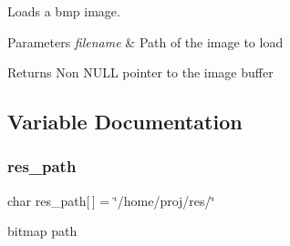 Loads a bmp image. 


\begin{DoxyParams}{Parameters}
{\em filename} & Path of the image to load \\
\hline
\end{DoxyParams}
\begin{DoxyReturn}{Returns}
Non N\+U\+LL pointer to the image buffer 
\end{DoxyReturn}


\subsection{Variable Documentation}
\mbox{\label{group___bitmap_ga2b225ffd0d59618d1b1fa8396ab6e970}} 
\subsubsection{\texorpdfstring{res\+\_\+path}{res\_path}}
{\footnotesize\ttfamily char res\+\_\+path\mbox{[}$\,$\mbox{]} = \char`\"{}/home/proj/res/\char`\"{}\hspace{0.3cm}{\ttfamily [static]}}



bitmap path 

